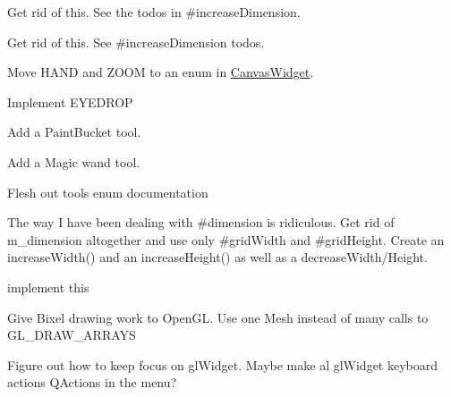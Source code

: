 
\begin{DoxyRefList}
\item[\label{todo__todo000003}%
\hypertarget{todo__todo000003}{}%
Member \hyperlink{classBixelGrid_a3980df6f8699db73452b0893190877ce}{Bixel\-Grid\-:\-:decrease\-Dimension} ()]Get rid of this. See the todos in \#increase\-Dimension.  
\item[\label{todo__todo000001}%
\hypertarget{todo__todo000001}{}%
Member \hyperlink{classBixelGrid_aac761dbec07e93c105dd7332e982698c}{Bixel\-Grid\-:\-:dimension} ()]Get rid of this. See \#increase\-Dimension todos.  
\item[\label{todo__todo000005}%
\hypertarget{todo__todo000005}{}%
Member \hyperlink{classBixelGrid_a2f45709d9159599eb3af5ceed54fc550}{Bixel\-Grid\-:\-:Draw\-Tool} ]Move H\-A\-N\-D and Z\-O\-O\-M to an enum in \hyperlink{classCanvasWidget}{Canvas\-Widget}. 

Implement E\-Y\-E\-D\-R\-O\-P 

Add a Paint\-Bucket tool. 

Add a Magic wand tool. 

Flesh out tools enum documentation  
\item[\label{todo__todo000002}%
\hypertarget{todo__todo000002}{}%
Member \hyperlink{classBixelGrid_a589e8542077e6afea967a85e8d040298}{Bixel\-Grid\-:\-:increase\-Dimension} ()]The way I have been dealing with \#dimension is ridiculous. Get rid of m\-\_\-dimension altogether and use only \#grid\-Width and \#grid\-Height. Create an increase\-Width() and an increase\-Height() as well as a decrease\-Width/\-Height.  
\item[\label{todo__todo000006}%
\hypertarget{todo__todo000006}{}%
Member \hyperlink{classBixelGrid_a2f45709d9159599eb3af5ceed54fc550aa9b97045f133062453e585409323d940}{Bixel\-Grid\-:\-:P\-A\-I\-N\-T\-B\-U\-C\-K\-E\-T} ]implement this  
\item[\label{todo__todo000004}%
\hypertarget{todo__todo000004}{}%
Member \hyperlink{classBixelGrid_a5ddc685a7df1db41dd1716e03342d619}{Bixel\-Grid\-:\-:paint\-G\-L} ()]Give Bixel drawing work to Open\-G\-L. Use one Mesh instead of many calls to G\-L\-\_\-\-D\-R\-A\-W\-\_\-\-A\-R\-R\-A\-Y\-S  
\item[\label{todo__todo000007}%
\hypertarget{todo__todo000007}{}%
Class \hyperlink{classBixelWindow}{Bixel\-Window} ]Figure out how to keep focus on gl\-Widget. Maybe make al gl\-Widget keyboard actions Q\-Actions in the menu? 
\end{DoxyRefList}